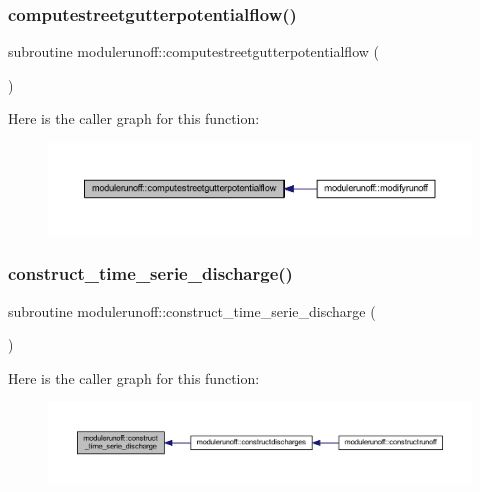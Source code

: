 \subsubsection{\texorpdfstring{computestreetgutterpotentialflow()}{computestreetgutterpotentialflow()}}
{\footnotesize\ttfamily subroutine modulerunoff\+::computestreetgutterpotentialflow (\begin{DoxyParamCaption}{ }\end{DoxyParamCaption})\hspace{0.3cm}{\ttfamily [private]}}

Here is the caller graph for this function\+:
\nopagebreak
\begin{figure}[H]
\begin{center}
\leavevmode
\includegraphics[width=350pt]{namespacemodulerunoff_a275dc22b830688ac27f2e1ab0cec626c_icgraph}
\end{center}
\end{figure}
\mbox{\label{namespacemodulerunoff_a7d3fe3f8c8fecb1a73f35d1963f7b2b5}} 
\subsubsection{\texorpdfstring{construct\+\_\+time\+\_\+serie\+\_\+discharge()}{construct\_time\_serie\_discharge()}}
{\footnotesize\ttfamily subroutine modulerunoff\+::construct\+\_\+time\+\_\+serie\+\_\+discharge (\begin{DoxyParamCaption}{ }\end{DoxyParamCaption})\hspace{0.3cm}{\ttfamily [private]}}

Here is the caller graph for this function\+:
\nopagebreak
\begin{figure}[H]
\begin{center}
\leavevmode
\includegraphics[width=350pt]{namespacemodulerunoff_a7d3fe3f8c8fecb1a73f35d1963f7b2b5_icgraph}
\end{center}
\end{figure}
\mbox{\label{namespacemodulerunoff_aaa760a0a33dfff4681a831fe25d1b075}} 
